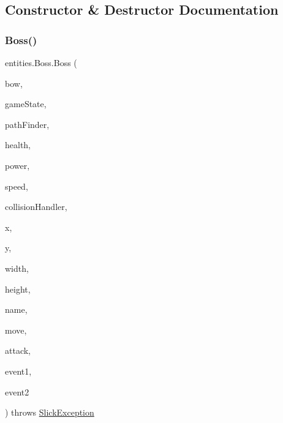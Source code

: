 \subsection{Constructor \& Destructor Documentation}
\mbox{\label{classentities_1_1_boss_a777259c0c3dfa9b82e3f719c978976f4}} 
\subsubsection{\texorpdfstring{Boss()}{Boss()}}
{\footnotesize\ttfamily entities.\+Boss.\+Boss (\begin{DoxyParamCaption}\item[{boolean}]{bow,  }\item[{\mbox{\hyperlink{classstates_1_1_game_state}{Game\+State}}}]{game\+State,  }\item[{\mbox{\hyperlink{classentities_1_1_path_finder}{Path\+Finder}}}]{path\+Finder,  }\item[{int}]{health,  }\item[{int}]{power,  }\item[{float}]{speed,  }\item[{\mbox{\hyperlink{classentities_1_1_collision_handler}{Collision\+Handler}}}]{collision\+Handler,  }\item[{float}]{x,  }\item[{float}]{y,  }\item[{float}]{width,  }\item[{float}]{height,  }\item[{String}]{name,  }\item[{\mbox{\hyperlink{classorg_1_1newdawn_1_1slick_1_1_image}{Image}}}]{move,  }\item[{\mbox{\hyperlink{classorg_1_1newdawn_1_1slick_1_1_image}{Image}}}]{attack,  }\item[{\mbox{\hyperlink{interfaceentities_1_1_event_launcher}{Event\+Launcher}}}]{event1,  }\item[{\mbox{\hyperlink{interfaceentities_1_1_event_launcher}{Event\+Launcher}}}]{event2 }\end{DoxyParamCaption}) throws \mbox{\hyperlink{classorg_1_1newdawn_1_1slick_1_1_slick_exception}{Slick\+Exception}}\hspace{0.3cm}{\ttfamily [inline]}}


